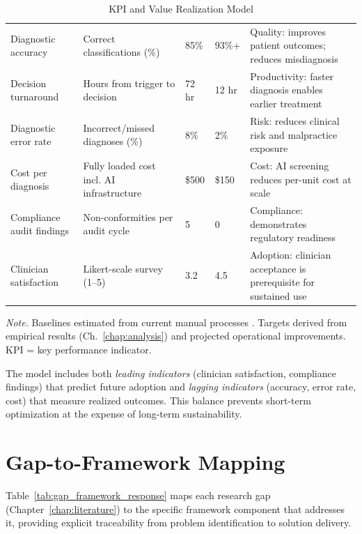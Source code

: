 \begin{table}[H]
\tablestripes
\small
\begin{tabularx}{\textwidth}{L L p{1cm} p{1cm} L}
\toprule
{} &  &  &  &  \\
\midrule
Diagnostic accuracy & Correct classifications (\%) & 85\% & 93\%+ & Quality: improves patient outcomes; reduces misdiagnosis \\
\addlinespace
Decision turnaround & Hours from trigger to decision & 72 hr & 12 hr & Productivity: faster diagnosis enables earlier treatment \\
\addlinespace
Diagnostic error rate & Incorrect/missed diagnoses (\%) & 8\% & 2\% & Risk: reduces clinical risk and malpractice exposure \\
\addlinespace
Cost per diagnosis & Fully loaded cost incl. AI infrastructure & \$500 & \$150 & Cost: AI screening reduces per-unit cost at scale \\
\addlinespace
Compliance audit findings & Non-conformities per audit cycle & 5 & 0 & Compliance: demonstrates regulatory readiness \\
\addlinespace
Clinician satisfaction & Likert-scale survey (1--5) & 3.2 & 4.5 & Adoption: clinician acceptance is prerequisite for sustained use \\
\bottomrule
\end{tabularx}
\caption{KPI and Value Realization Model}
\label{tab:kpi_model}
\vspace{0.5em}\noindent\textit{Note.} Baselines estimated from current manual processes \citep{kelly2019healthcare}. Targets derived from empirical results (Ch.~\ref{chap:analysis}) and projected operational improvements. KPI = key performance indicator.
\end{table}

The model includes both \textit{leading indicators} (clinician satisfaction, compliance findings) that predict future adoption and \textit{lagging indicators} (accuracy, error rate, cost) that measure realized outcomes. This balance prevents short-term optimization at the expense of long-term sustainability.

\section{Gap-to-Framework Mapping}
\label{sec:fw_gaps}

Table~\ref{tab:gap_framework_response} maps each research gap (Chapter~\ref{chap:literature}) to the specific framework component that addresses it, providing explicit traceability from problem identification to solution delivery.


